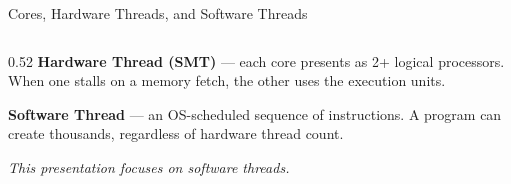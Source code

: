 \documentclass[aspectratio=169]{beamer}
\begin{document}
\begin{frame}{Cores, Hardware Threads, and Software Threads}
\begin{columns}
\begin{column}{0.52\textwidth}
            \pause
            \vspace{0.6em}
            \textbf{Hardware Thread (SMT)} --- each core presents as
            2+ logical processors. When one stalls on a memory
            fetch, the other uses the execution units.

            \pause
            \vspace{0.6em}
            \textbf{Software Thread} --- an OS-scheduled sequence of
            instructions. A program can create thousands, regardless of
            hardware thread count.

            \vspace{0.8em}
            \textit{\small This presentation focuses on software threads.}
        \end{column}
    \end{columns}
\end{frame}
\end{document}
